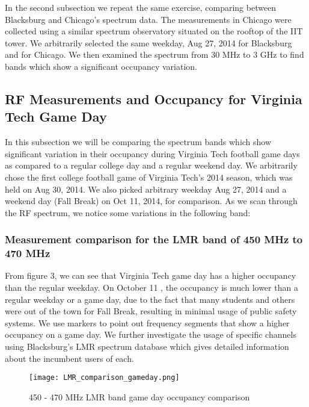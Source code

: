 \documentclass[12pt,sts]{report}
\begin{document}
In the second subsection we repeat the same exercise, comparing between Blacksburg and Chicago's spectrum data. The measurements in Chicago were collected using a similar spectrum observatory situated on the rooftop of the IIT tower.
We arbitrarily selected the same weekday, Aug 27, 2014 for Blacksburg and for Chicago. We then examined the spectrum from 30 MHz to 3 GHz to find bands which show a significant occupancy variation.

	\subsection{RF Measurements and Occupancy for Virginia Tech Game Day}
	
	In this subsection we will be comparing the spectrum bands which show significant variation in their occupancy during Virginia Tech football game days as compared to a regular college day and a regular weekend day. We arbitrarily chose the first college football game of Virginia Tech's 2014 season, which was held on Aug 30, 2014. We also picked arbitrary weekday Aug 27, 2014 and a weekend day (Fall Break) on Oct 11, 2014, for comparison. %
	As we scan through the RF spectrum, we notice some variations in the following band:
	
		\subsubsection{Measurement comparison for the LMR band of 450 MHz to 470 MHz}
		
		From figure 3, we can see that Virginia Tech game day has a higher occupancy than the regular weekday. On October 11 %
		, the occupancy is much lower than a regular weekday or a game day, due to the fact that many students and others were out of the town for Fall Break, resulting in minimal usage of public safety systems. We use markers to point out frequency segments that show a higher occupancy on a game day. We further investigate the usage of specific channels using Blacksburg's LMR spectrum database \cite{blacksburg_spec_occ} which gives detailed information about the incumbent users of each.
		
		\begin{figure}[ht!]
			\centering
				\texttt{[image: LMR\_comparison\_gameday.png]}
			\caption{450 - 470 MHz LMR band game day occupancy comparison}
		\end{figure}
		
\end{document}
